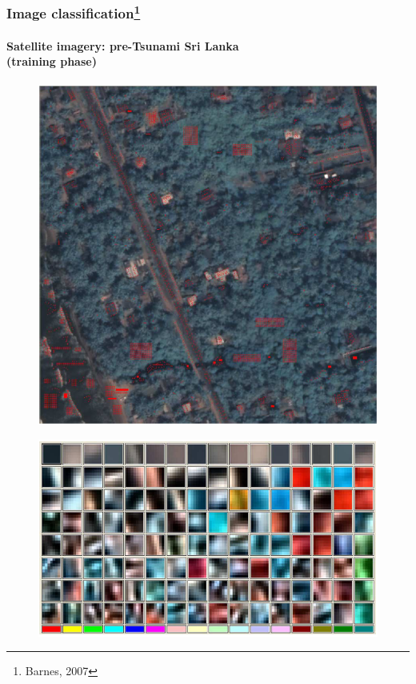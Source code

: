 \begin{frame}
\frametitle{Image classification\footnote{Barnes, 2007}}
\framesubtitle{\small Satellite imagery: pre-Tsunami Sri Lanka \\(training phase)}
\mypagenum{}
	\begin{figure}		
		\includegraphics[height=0.3\textheight]{thesis/RVQ_SatelliteSriLanka_1_snippets.png}			
	\end{figure}
	\begin{figure}		
		\includegraphics[height=0.35\textheight]{thesis/RVQ_SatelliteSriLanka_2_codebooks.png}			
	\end{figure}
\end{frame}


